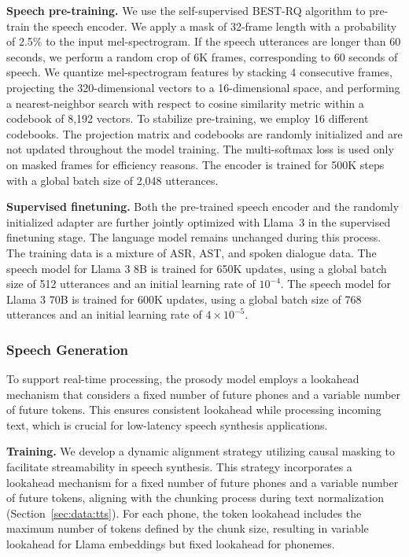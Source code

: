 \textbf{Speech pre-training.} We use the self-supervised BEST-RQ algorithm \citep{chiu2022self} to pre-train the speech encoder. We apply a mask of 32-frame length with a probability of 2.5\% to the input mel-spectrogram. If the speech utterances are longer than 60 seconds, we perform a random crop of 6K frames, corresponding to 60 seconds of speech. We quantize mel-spectrogram features by stacking 4 consecutive frames, projecting the 320-dimensional vectors to a 16-dimensional space, and performing a nearest-neighbor search with respect to cosine similarity metric within a codebook of 8,192 vectors. To stabilize pre-training, we employ 16 different codebooks. The projection matrix and codebooks are randomly initialized and are not updated throughout the model training. The multi-softmax loss is used only on masked frames for efficiency reasons. The encoder is trained for 500K steps with a global batch size of 2,048 utterances.

\textbf{Supervised finetuning.} Both the pre-trained speech encoder and the randomly initialized adapter are further jointly optimized with Llama~3 in the supervised finetuning stage. The language model remains unchanged during this process. The training data is a mixture of ASR, AST, and spoken dialogue data. The speech model for Llama 3 8B is trained for 650K updates, using a global batch size of 512 utterances and an initial learning rate of $10^{-4}$. The speech model for Llama 3 70B is trained for 600K updates, using a global batch size of 768 utterances and an initial learning rate of $4\times10^{-5}$.

\subsubsection{Speech Generation} To support real-time processing, the prosody model employs a lookahead mechanism that considers a fixed number of future phones and a variable number of future tokens. This ensures consistent lookahead while processing incoming text, which is crucial for low-latency speech synthesis applications.

\textbf{Training.} We develop a dynamic alignment strategy utilizing causal masking to facilitate streamability in speech synthesis. This strategy incorporates a lookahead mechanism for a fixed number of future phones and a variable number of future tokens, aligning with the chunking process during text normalization (Section~\ref{sec:data:tts}). For each phone, the token lookahead includes the maximum number of tokens defined by the chunk size, resulting in variable lookahead for Llama embeddings but fixed lookahead for phonemes.

